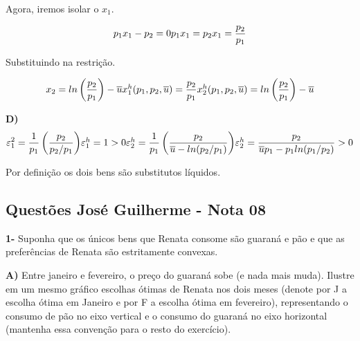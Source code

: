 \begin{flushleft}
\begin{center}
Agora, iremos isolar o $x_{1}$.
\end{center}


\begin{equation}
p_{1}x_{1} - p_{2} = 0
$$\\$$
p_{1}x_{1} = p_{2}
$$\\$$
x_{1} = \dfrac{p_{2}}{p_{1}}
\end{equation}

\begin{center}
Substituindo na restrição.
\end{center}

\begin{equation}
x_{2} = ln \left(\dfrac{p_{2}}{p_{1}} \right) - \overline{u} 
$$\\$$
x_{1}^h(p_{1},p_{2},\overline{u}) = \dfrac{p_{2}}{p_{1}}
$$\\$$
x_{2}^h(p_{1},p_{2},\overline{u}) =  ln \left(\dfrac{p_{2}}{p_{1}} \right) - \overline{u} 
\end{equation}
\singlespacing

\textbf{D)}
\\
\begin{equation}
\varepsilon_{1}^2 = \dfrac{1}{p_{1}} \left(\dfrac{p_{2}}{p_{2}/p_{1}} \right)
$$\\$$
\varepsilon_{1}^h = 1>0
$$\\$$
\varepsilon_{2}^h = \dfrac{1}{p_{1}} \left(\dfrac{p_{2}}{\overline{u}-ln(p_{2}/p_{1})} \right)
$$\\$$
\varepsilon_{2}^h = \dfrac{p_{2}}{\overline{u}p_{1} - p_{1}ln(p_{1}/p_{2})} > 0
\end{equation}
\begin{center}
Por definição os dois bens são substitutos líquidos.
\end{center}
\singlespacing

\begin{center}
	\section*{Questões José Guilherme - Nota 08}
\end{center}
\singlespacing

\textbf{1-} Suponha que os únicos bens que Renata consome são guaraná e pão e que as preferências de Renata são estritamente convexas.
\singlespacing

\textbf{A)} Entre janeiro e fevereiro, o preço do guaraná sobe (e nada mais muda). Ilustre em um mesmo gráfico escolhas ótimas de Renata nos dois meses (denote por J a escolha ótima em Janeiro e por F a escolha ótima em fevereiro), representando o consumo de pão no
eixo vertical e o consumo do guaraná no eixo horizontal (mantenha essa convenção para
o resto do exercício).
\singlespacing


\end{flushleft}
